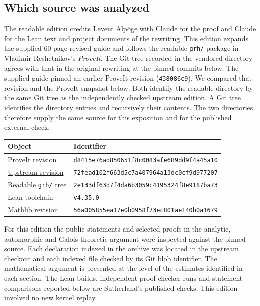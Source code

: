 \documentclass[11pt,letterpaper]{article}
\begin{document}
\subsection{Which source was analyzed}
The readable edition credits Levent Alpöge with Claude for the proof and Claude for the Lean text and project documents of the rewriting. This edition expands the supplied 60-page revised guide and follows the readable \texttt{grh/} package in Vladimir Reshetnikov's \emph{ProveIt}. The Git tree recorded in the vendored directory agrees with that in the original rewriting at the pinned commits below. The supplied guide pinned an earlier ProveIt revision (\texttt{438086c9}). We compared that revision and the ProveIt snapshot below. Both identify the readable directory by the same Git tree as the independently checked upstream edition. A Git tree identifies the directory entries and recursively their contents. The two directories therefore supply the same source for this exposition and for the published external check.
\begin{center}\small\renewcommand{\arraystretch}{1.12}
\begin{tabular}{@{}ll@{}}\toprule
\textbf{Object}&\textbf{Identifier}\\\midrule
\href{https://github.com/VladimirReshetnikov/ProveIt/tree/d8415e76ad850651f8c0083afe689dd9f4a45a10/Analysis/GeneralizedRiemannHypothesis/vendor/grh-lean}{ProveIt revision}&\texttt{d8415e76ad850651f8c0083afe689dd9f4a45a10}\\
\href{https://github.com/lsernau/grh-lean/tree/72fead102f663d5c7a407964a13dc0cf9d977207/grh}{Upstream revision}&\texttt{72fead102f663d5c7a407964a13dc0cf9d977207}\\
Readable \texttt{grh/} tree&\texttt{2e133df63d7f4da6b3059c4195324f8e9187ba73}\\
Lean toolchain&\texttt{v4.35.0}\\
Mathlib revision&\texttt{56a005855ea17e0b0958f73ec801ae140b0a1679}\\
\bottomrule\end{tabular}\end{center}
For this edition the public statements and selected proofs in the analytic, automorphic and Galois-theoretic argument were inspected against the pinned source. Each declaration indexed in the archive was located in the upstream checkout and each indexed file checked by its Git blob identifier. The mathematical argument is presented at the level of the estimates identified in each section. The Lean builds, independent proof-checker runs and statement comparisons reported below are Sutherland's published checks. This edition involved no new kernel replay.
\end{document}

